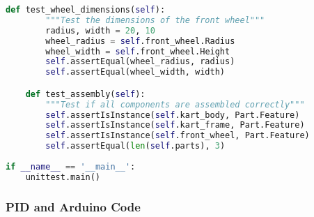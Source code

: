 \documentclass[a4paper,12pt]{report}
\begin{document}
\begin{lstlisting}[language=Python]
    def test_wheel_dimensions(self):
        """Test the dimensions of the front wheel"""
        radius, width = 20, 10
        wheel_radius = self.front_wheel.Radius
        wheel_width = self.front_wheel.Height
        self.assertEqual(wheel_radius, radius)
        self.assertEqual(wheel_width, width)

    def test_assembly(self):
        """Test if all components are assembled correctly"""
        self.assertIsInstance(self.kart_body, Part.Feature)
        self.assertIsInstance(self.kart_frame, Part.Feature)
        self.assertIsInstance(self.front_wheel, Part.Feature)
        self.assertEqual(len(self.parts), 3)  
        
if __name__ == '__main__':
    unittest.main()
\end{lstlisting}
\subsubsection{PID and Arduino Code}
\end{document}
